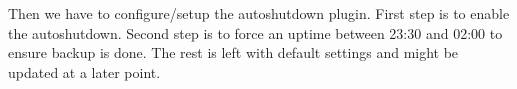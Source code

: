 Then we have to configure/setup the autoshutdown plugin. First step is to
enable the autoshutdown. Second step is to force an uptime between 23:30 and
02:00 to ensure backup is done. The rest is left with default settings and
might be updated at a later point.



